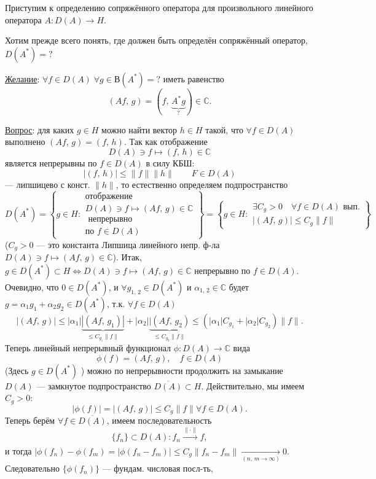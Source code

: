 \documentclass[a4paper]{article}
\begin{document}
Приступим к определению сопряжённого оператора для произвольного
линейного оператора
$A : D(A) \to H$.

Хотим прежде всего понять, где должен быть определён сопряжённый
оператор, \underline{$D(A^*)=?$}

\underline{Желание}: $\forall f \in  D(A) \; \forall g \in 
В(A^*)=?$ иметь равенство 
 \[
	 \left( Af,\,g \right) =\left(f,\,\underbrace{A^*g}_{?}\right) \in \mathbb{C}
 .\] 

 \underline{Вопрос}: для каких $g \in  H$ можно найти вектор
 $h \in H$ такой, что $\forall f \in  D(A)$ выполнено
 $\left( Af,\,g \right) =(f,\,h)$. Так как отображение
\[
	D(A) \ni f \mapsto (f,\,h) \in \mathbb{C}
\]
является непрерывны по $f \in  D(A)$ в силу КБШ:
\[
	|(f,\,h)|\le \| f\| \| h\| \qquad F \in D(A)
\]
--- липшицево с конст. $\| h\|$,
то естественно определяем подпространство
\[
	D(A^*) = \left\{  g \in H :
\substack{ \text{отображение } \\ 
D(A) \ni f \mapsto (Af,\,g) \in \mathbb{C}\\
\text{ непрерывно}\\ \text{по } f \in D(A)}\right\} 
=
\left\{ g \in H:
\substack{\exists C_g > 0 \quad \forall f \in D(A) \text{ вып.}\\
|(Af,\,g)|\le C_g \| f\|}\right\} 
\]
($C_g>0$ --- это константа Липшица линейного непр. ф-ла
$D(A) \ni f \mapsto (Af,\,g) \in \mathbb{C}$).
Итак, $g \in  D(A^*)\subset H \Leftrightarrow
 D(A) \ni f \mapsto  (Af,\,g) \in \mathbb{C}$ непрерывно по 
$f \in D(A)$. Очевидно, что $0 \in D(A^*)$, и 
$\forall g_{1,\,2} \in  D(A^*)$ и $\alpha_{1,\,2} \in \mathbb{C}$ 
будет $g=\alpha_1 g_1 + \alpha_2 g_2 \in D(A^*)$, т.\:к.
$\forall f \in D(A)$ 
\[
	|(Af,\,g)|\le |\alpha_1|
	\underbrace{|(Af,\,g_1)|}_{\le C_{g_1}\| f\|}+
	|\alpha_2| \underbrace{|(Af,\,g_2)}_{\le C_{g_2}\| f\|}\le 
	(|\alpha_1| C_{g_1}+ |\alpha_2| C_{g_2}) \| f\|
.\] 
Теперь линейный непрерывный функционал $\phi : D(A) \to \mathbb{C}$ 
вида 
\[
	\phi(f) =(Af,\,g), \quad f \in D(A)
\]
(Здесь $g \in D(A^*)$ ) можно по непрерывности продолжить на
замыкание $D(A)$ --- замкнутое подпространство $\overline{D(A)}
 \subset H$. Действительно, мы имеем $C_g>0$:
 \[
	 |\phi(f)|= |(Af,\,g)|\le 
	 C_g \| f\| \forall f \in D(A)
 .\] 
 Теперь берём $\forall f \in \overline{D(A)}$, имеем последовательность
 \[
	 \{f_n\} \subset D(A): f_n \xrightarrow[]{\| \cdot\|}f,
\]
и тогда $|\phi(f_n) -\phi(f_m)=|\phi(f_n -f_m)|\le 
 C_g \| f_n -f_m\|\xrightarrow[(n,\,m\to \infty)]{} 0$.
Следовательно $\{\phi(f_n)\} $ --- фундам. числовая посл-ть,
\end{document}
